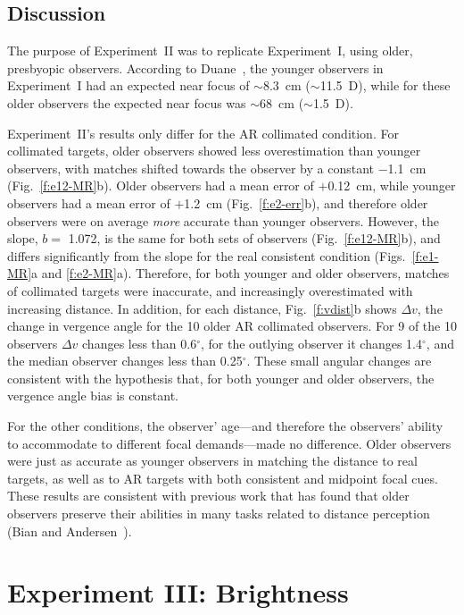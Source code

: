 \documentclass[10pt,journal,compsoc]{IEEEtran}
\begin{document}
\subsection {Discussion}

The purpose of Experiment~II was to replicate Experiment~I, using older, presbyopic observers.  According to Duane~\cite{duane:1912}, the younger observers in Experiment~I had an expected near focus of $\sim$8.3~cm ($\sim$11.5~D), while for these older observers the expected near focus was $\sim$68~cm ($\sim$1.5~D).

Experiment~II's results only differ for the AR collimated condition.  For collimated targets, older observers showed less overestimation than younger observers, with matches shifted towards the observer by a constant $-$1.1~cm (Fig.~\ref{f:e12-MR}b).  Older observers had a mean error of $+$0.12~cm, while younger observers had a mean error of $+$1.2~cm (Fig.~\ref{f:e2-err}b), and therefore older observers were on average \emph{more} accurate than younger observers.  However, the slope, $b =$ 1.072, is the same for both sets of observers (Fig.~\ref{f:e12-MR}b), and differs significantly from the slope for the real consistent condition (Figs.~\ref{f:e1-MR}a and \ref{f:e2-MR}a).  Therefore, for both younger and older observers, matches of collimated targets were inaccurate, and increasingly overestimated with increasing distance.  In addition, for each distance, Fig.~\ref{f:vdist}b shows $\Delta v$, the change in vergence angle for the 10 older AR collimated observers.  For 9 of the 10 observers $\Delta v$ changes less than 0.6$^{\circ}$, for the outlying observer it changes 1.4$^{\circ}$, and the median observer changes less than 0.25$^{\circ}$.  These small angular changes are consistent with the hypothesis that, for both younger and older observers, the vergence angle bias  is constant.
 
For the other conditions, the observer' age---and therefore the observers' ability to accommodate to different focal demands---made no difference.  Older observers were just as accurate as younger observers in matching the distance to real targets, as well as to AR targets with both consistent and midpoint focal cues.  These results are consistent with previous work that has found that older observers preserve their abilities in many tasks related to distance perception (Bian and Andersen~\cite{bian:2013}).






\section {Experiment III: Brightness}
\label{s:exIII}
\end{document}
